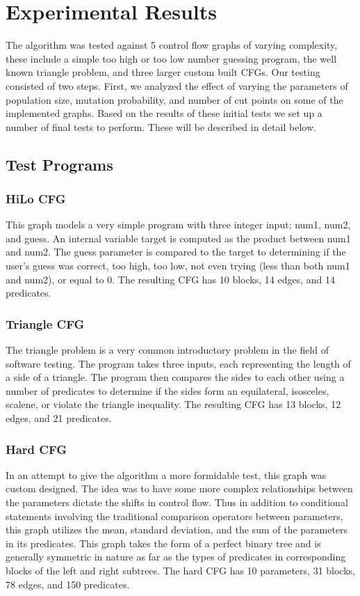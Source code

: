 \documentclass[runningheads]{llncs}
\begin{document}
\newpage

\section{Experimental Results}

The algorithm was tested against 5 control flow graphs of varying complexity, these include a simple too high or too low number guessing program, the well known triangle problem, and three larger custom built CFGs. Our testing consisted of two steps. First, we analyzed the effect of varying the parameters of population size, mutation probability, and number of cut points on some of the implemented graphs. Based on the results of these initial tests we set up a number of final tests to perform. These will be described in detail below. 
  
\subsection{Test Programs}

\subsubsection{HiLo CFG}
This graph models a very simple program with three integer input; num1, num2, and guess. An internal variable target is computed as the product between num1 and num2. The guess parameter is compared to the target to determining if the user's guess was correct, too high, too low, not even trying (less than both num1 and num2), or equal to 0. The resulting CFG has 10 blocks, 14 edges, and 14 predicates.

\subsubsection{Triangle CFG}
The triangle problem is a very common introductory problem in the field of software testing. The program takes three inputs, each representing the length of a side of a triangle. The program then compares the sides to each other using a number of predicates to determine if the sides form an equilateral, isosceles, scalene, or violate the triangle inequality. The resulting CFG has 13 blocks, 12 edges, and 21 predicates.

\subsubsection{Hard CFG}
In an attempt to give the algorithm a more formidable test, this graph was custom designed. The idea was to have some more complex relationships between the parameters dictate the shifts in control flow. Thus in addition to conditional statements involving the traditional comparison operators between parameters, this graph utilizes the mean, standard deviation, and the sum of the parameters in its predicates. This graph takes the form of a perfect binary tree and is generally symmetric in nature as far as the types of predicates in corresponding blocks of the left and right subtrees. The hard CFG has 10 parameters, 31 blocks, 78 edges, and 150 predicates.
\end{document}
